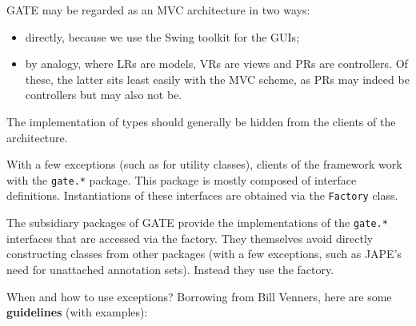 GATE may be regarded as an MVC architecture in two ways:
\begin{itemize}
\item 
directly, because we use the Swing toolkit for the GUIs;
\item 
by analogy, where LRs are models, VRs are views and PRs are controllers.
Of these, the latter sits least
easily with the MVC scheme, as PRs may indeed be controllers but may also
not be.
\end{itemize}




The implementation of types should generally be hidden from the clients of
the architecture.



With a few exceptions (such as for utility classes),
clients of the framework work with the {\tt gate.*} package.
This package is mostly composed of interface definitions.
Instantiations of these interfaces are obtained via the {\tt Factory}
class.

The subsidiary packages of GATE provide the implementations of the
{\tt gate.*} interfaces that are accessed via the factory. They
themselves avoid directly constructing classes from other packages
(with a few exceptions, such as JAPE's need for unattached annotation
sets). Instead they use the factory.



When and how to use exceptions? Borrowing from Bill Venners, here
are some {\bf guidelines} (with examples):

